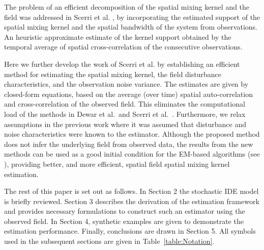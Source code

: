 \documentclass[10pt,twocolumn,twoside]{IEEEtran}
\begin{document}
The problem of an efficient decomposition of the spatial mixing kernel and the field was addressed in Scerri et al.  \cite{Scerri2009}, by incorporating the estimated support of the spatial mixing kernel and the spatial bandwidth of the system from observations.
An heuristic approximate estimate of the kernel support obtained by the temporal average of spatial cross-correlation of the consecutive observations.

Here we further develop the work of Scerri et al.  \cite{Scerri2009} by establishing an efficient method for estimating the spatial mixing kernel, the field disturbance characteristics, and the observation noise variance.
The estimates are given by closed-form equations, based on the average (over time) spatial auto-correlation and cross-correlation of the observed field.
This eliminates the computational load of the methods in Dewar et al.\ and Scerri et al.\ \cite{Dewar2009,Scerri2009}.
Furthermore, we relax assumptions in the previous work where it was assumed that disturbance and noise characteristics were known to the estimator.
Although the proposed method does not infer the underlying field from observed data, the results from the new methods can be used as a good initial condition for the EM-based algorithms (see \cite{Dewar2009,Xu2007}), providing better, and more efficient, spatial field spatial mixing kernel estimation.

The rest of this paper is set out as follows.
In Section 2 the stochastic IDE model is briefly reviewed.
Section 3 describes the derivation of the estimation framework and provides necessary formulations to construct such an estimator using the observed field.
In Section 4, synthetic examples are given to demonstrate the estimation performance.
Finally, conclusions are drawn in Section 5.
All symbols used in the subsequent sections are given in Table~\ref{table:Notation}.
\end{document}
